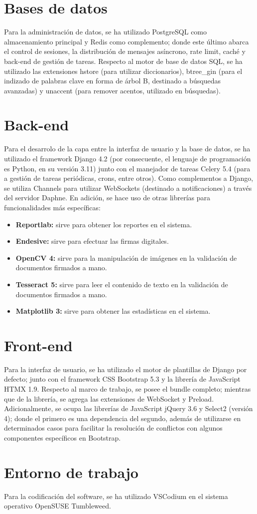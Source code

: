 \section{Bases de datos}
\normalsize{\indent
Para la administraci\'on de datos, se
ha utilizado PostgreSQL como almacenamiento
principal y Redis como complemento; donde
este \'ultimo abarca el control de
sesiones, la distribuci\'on de mensajes
as\'incrono, rate limit, cach\'e y back-end
de gesti\'on de tareas. Respecto al
motor de base de datos SQL, se ha utilizado
las extensiones hstore (para utilizar
diccionarios), btree\_gin (para el indizado
de palabras clave en forma de \'arbol B,
destinado a b\'usquedas avanzadas) y
unaccent (para remover acentos, utilizado
en b\'usquedas).
}
\section{Back-end}
\normalsize{\indent
Para el desarrolo de la capa entre la
interfaz de usuario y la base de datos,
se ha utilizado el framework Django 4.2
(por consecuente, el lenguaje de
programaci\'on es Python, en su versi\'on
3.11) junto con el manejador de tareas
Celery 5.4 (para a gesti\'on de tareas
peri\'odicas, crons, entre otros).
Como complementos a Django, se utiliza
Channels para utilizar WebSockets
(destinado a notificaciones) a trav\'es
del servidor Daphne. En adici\'on,
se hace uso de otras librer\'ias para
funcionalidades m\'as espec\'ificas:
}
\begin{itemize}
	\item \textbf{Reportlab:} sirve
	para obtener los reportes en el
	sistema.
	\item \textbf{Endesive:} sirve para
	efectuar las firmas digitales.
	\item \textbf{OpenCV 4:} sirve para
	la manipulaci\'on de im\'agenes en
	la validaci\'on de documentos
	firmados a mano.
	\item \textbf{Tesseract 5:} sirve
	para leer el contenido de texto en
	la validaci\'on de documentos
	firmados a mano.
	\item \textbf{Matplotlib 3:} sirve
	para obtener las estad\'isticas
	en el sistema.
\end{itemize}
\section{Front-end}
\normalsize{\indent
Para la interfaz de usuario, se ha
utilizado el motor de plantillas de
Django por defecto; junto con el
framework CSS Bootstrap 5.3 y la
librer\'ia de JavaScript HTMX 1.9.
Respecto al marco de trabajo, se
posee el bundle completo; mientras
que de la librer\'ia, se agrega las
extensiones de WebSocket y Preload.
Adicionalmente, se ocupa las librer\'ias
de JavaScript jQuery 3.6 y Select2
(versi\'on 4); donde el primero es
una dependencia del segundo, adem\'as
de utilizarse en determinados casos
para facilitar la resoluci\'on
de conflictos con algunos componentes
espec\'ificos en Bootstrap.
}
\section{Entorno de trabajo}
\normalsize{\indent
Para la codificaci\'on del software,
se ha utilizado VSCodium en el
sistema operativo OpenSUSE
Tumbleweed.
}